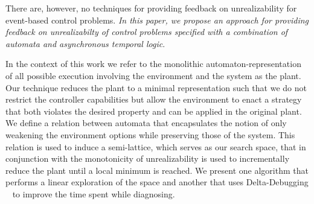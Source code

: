 There are, however, no techniques for providing feedback on unrealizability for 
event-based control problems. \emph{In this paper, we propose an approach for  
providing  feedback on unrealizabilty of control problems specified with a combination of 
automata and asynchronous temporal logic}.
%
%
%

In the context of this work we refer to the monolithic automaton-representation of all 
possible execution involving the environment and the system as the plant. Our 
technique reduces the plant to a minimal representation such that we do not restrict the 
controller capabilities but allow the 
environment to 
enact a strategy that both violates the desired property and can be applied in the 
original plant. We define a relation between automata that encapsulates the notion of 
only weakening the environment options while preserving those of the system. This 
relation is used to induce a semi-lattice, which serves as our search space, that in conjunction with the 
monotonicity of unrealizability is used to incrementally reduce the plant until a local 
minimum is reached. We present one algorithm that performs a linear exploration of the 
space and another that uses Delta-Debugging ~\cite{DBLP:journals/tse/ZellerH02} to 
 improve the time spent while diagnosing.


